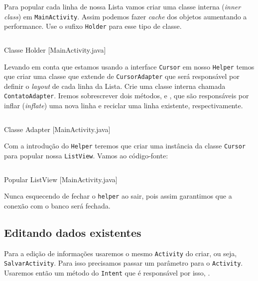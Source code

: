 Para popular cada linha de nossa Lista vamos criar uma classe interna (\textit{inner class}) em
\texttt{MainActivity}. Assim podemos fazer \textit{cache} dos objetos aumentando a performance.
Use o sufixo \texttt{Holder} para esse tipo de classe.

\begin{listing}[H]
  \inputminted[linenos=true,frame=bottomline,tabsize=3]{ java }{ source/MainActivity-4.java }
  \caption{Classe Holder [MainActivity.java]}
\end{listing}

Levando em conta que estamos usando a interface \texttt{Cursor} em nosso \texttt{Helper} temos
que criar uma classe que extende de \texttt{CursorAdapter} que será responsável por definir o
\textit{layout} de cada linha da Lista. Crie uma classe interna chamada \texttt{ContatoAdapter}.
Iremos sobrescrever dois métodos,  e , que são responsáveis
por inflar (\textit{inflate}) uma nova linha e reciclar uma linha existente, respectivamente.

\begin{listing}[H]
  \inputminted[linenos=true,frame=bottomline,tabsize=3]{ java }{ source/MainActivity-5.java }
  \caption{Classe Adapter [MainActivity.java]}
\end{listing}

Com a introdução do \texttt{Helper} teremos que criar uma instância da classe \texttt{Cursor}
para popular nossa \texttt{ListView}. Vamos ao código-fonte:

\begin{listing}[H]
  \inputminted[linenos=true,frame=bottomline,tabsize=3]{ java }{ source/MainActivity-6.java }
  \caption{Popular ListView [MainActivity.java]}
\end{listing}

Nunca esquecendo de fechar o \texttt{helper} ao sair, pois assim garantimos que a conexão com
o banco será fechada.

\subsection{Editando dados existentes}

Para a edição de informações usaremos o mesmo \texttt{Activity} do criar, ou seja, \texttt{SalvarActivity}.
Para isso precisamos passar um parâmetro para o \texttt{Activity}. Usaremos então um método do
\texttt{Intent} que é responsável por isso, .

